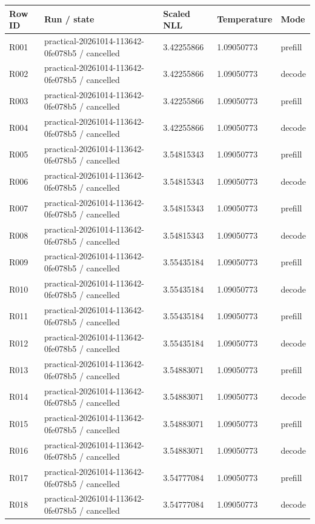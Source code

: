 \documentclass[10pt]{article}
\begin{document}
{\scriptsize\setlength{\tabcolsep}{2pt}
\begin{longtable}{p{}p{}p{}p{}p{}}
Row ID & Run / state & Scaled NLL & Temperature & Mode \\
\hline\endhead
R001 & practical-20261014-113642-0fe078b5 / cancelled & 3.42255866 & 1.09050773 & prefill \\
R002 & practical-20261014-113642-0fe078b5 / cancelled & 3.42255866 & 1.09050773 & decode \\
R003 & practical-20261014-113642-0fe078b5 / cancelled & 3.42255866 & 1.09050773 & prefill \\
R004 & practical-20261014-113642-0fe078b5 / cancelled & 3.42255866 & 1.09050773 & decode \\
R005 & practical-20261014-113642-0fe078b5 / cancelled & 3.54815343 & 1.09050773 & prefill \\
R006 & practical-20261014-113642-0fe078b5 / cancelled & 3.54815343 & 1.09050773 & decode \\
R007 & practical-20261014-113642-0fe078b5 / cancelled & 3.54815343 & 1.09050773 & prefill \\
R008 & practical-20261014-113642-0fe078b5 / cancelled & 3.54815343 & 1.09050773 & decode \\
R009 & practical-20261014-113642-0fe078b5 / cancelled & 3.55435184 & 1.09050773 & prefill \\
R010 & practical-20261014-113642-0fe078b5 / cancelled & 3.55435184 & 1.09050773 & decode \\
R011 & practical-20261014-113642-0fe078b5 / cancelled & 3.55435184 & 1.09050773 & prefill \\
R012 & practical-20261014-113642-0fe078b5 / cancelled & 3.55435184 & 1.09050773 & decode \\
R013 & practical-20261014-113642-0fe078b5 / cancelled & 3.54883071 & 1.09050773 & prefill \\
R014 & practical-20261014-113642-0fe078b5 / cancelled & 3.54883071 & 1.09050773 & decode \\
R015 & practical-20261014-113642-0fe078b5 / cancelled & 3.54883071 & 1.09050773 & prefill \\
R016 & practical-20261014-113642-0fe078b5 / cancelled & 3.54883071 & 1.09050773 & decode \\
R017 & practical-20261014-113642-0fe078b5 / cancelled & 3.54777084 & 1.09050773 & prefill \\
R018 & practical-20261014-113642-0fe078b5 / cancelled & 3.54777084 & 1.09050773 & decode \\

\end{longtable}}
\end{document}
